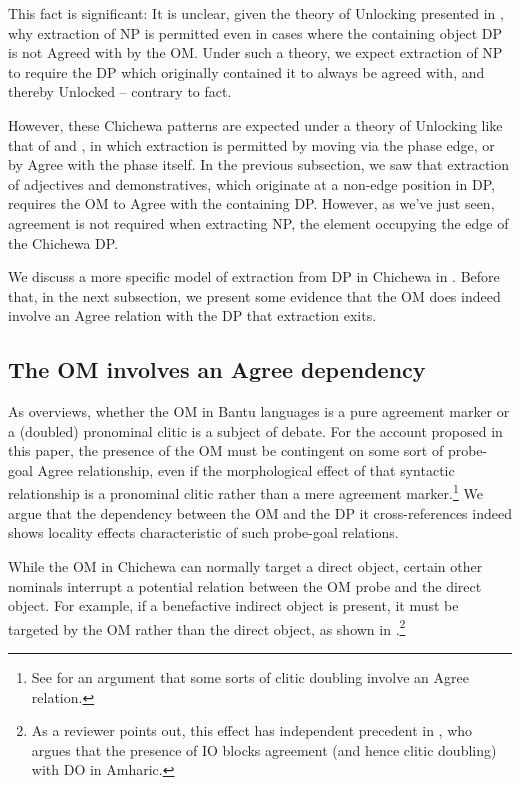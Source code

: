 \documentclass[output=paper,colorlinks,citecolor=brown]{langscibook}
\begin{document}
This fact is significant: It is unclear, given the theory of Unlocking presented in \citet{VanUrkRichards2015}, why extraction of NP is permitted even in cases where the containing object DP is not Agreed with by the OM. Under such a theory, we expect extraction of NP to require the DP which originally contained it to always be agreed with, and thereby Unlocked -- contrary to fact.

However, these Chichewa patterns are expected under a theory of Unlocking like that of \citet{RackowskiRichards2005} and \citet{Branan2018}, in which extraction is permitted by moving via the phase edge, or by Agree with the phase itself. In the previous subsection, we saw that extraction of adjectives and demonstratives, which originate at a non-edge position in DP, requires the OM to Agree with the containing DP. However, as we've just seen, agreement is not required when extracting NP, the element occupying the edge of the Chichewa DP.

We discuss a more specific model of extraction from DP in Chichewa in . Before that, in the next subsection, we present some evidence that the OM does indeed involve an Agree relation with the DP that extraction exits.

\subsection{The OM involves an Agree dependency}\label{sec:branan:3.3}\largerpage

As \citet{Baker2016} overviews, whether the OM in Bantu languages is a pure agreement marker or a (doubled) pronominal clitic is a subject of debate. For the account proposed in this paper, the presence of the OM must be contingent on some sort of probe-goal Agree relationship, even if the morphological effect of that syntactic relationship is a pronominal clitic rather than a mere agreement marker.\footnote{See \citet{Preminger2015} for an argument that some sorts of clitic doubling involve an Agree relation.} We argue that the dependency between the OM and the DP it cross-references indeed shows locality effects characteristic of such probe-goal relations.

While the OM in Chichewa can normally target a direct object, certain other nominals interrupt a potential relation between the OM probe and the direct object. For example, if a benefactive indirect object is present, it must be targeted by the OM rather than the direct object, as shown in .\footnote{As a reviewer points out, this effect has independent precedent in \citet{Kramer2014}, who argues that the presence of IO blocks agreement (and hence clitic doubling) with DO in Amharic.}
\end{document}
